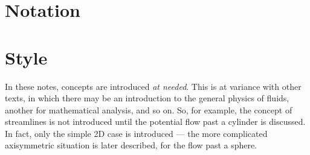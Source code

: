 \section{Notation}

\section{Style}

In these notes, concepts are introduced \emph{at needed}. This is at
variance with other texts, in which there may be an introduction to
the general physics of fluids, another for mathematical analysis, and
so on. So, for example, the concept of streamlines is not introduced
until the potential flow past a cylinder is discussed. In fact, only
the simple 2D case is introduced --- the more complicated axisymmetric
situation is later described, for the flow past a sphere.

